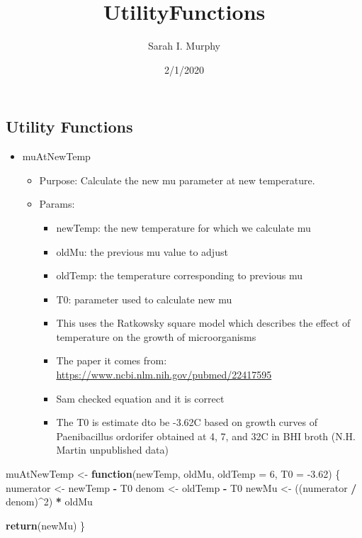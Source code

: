 \documentclass[]{article}
\title{UtilityFunctions}
\author{Sarah I. Murphy}
\date{2/1/2020}
\newenvironment{Shaded}{\begin{snugshade}}{\end{snugshade}}
\newcommand{\ControlFlowTok}[1]{\textcolor[rgb]{0.13,0.29,0.53}{\textbf{#1}}}
\newcommand{\DataTypeTok}[1]{\textcolor[rgb]{0.13,0.29,0.53}{#1}}
\newcommand{\DecValTok}[1]{\textcolor[rgb]{0.00,0.00,0.81}{#1}}
\newcommand{\FloatTok}[1]{\textcolor[rgb]{0.00,0.00,0.81}{#1}}
\newcommand{\KeywordTok}[1]{\textcolor[rgb]{0.13,0.29,0.53}{\textbf{#1}}}
\newcommand{\NormalTok}[1]{#1}
\newcommand{\OperatorTok}[1]{\textcolor[rgb]{0.81,0.36,0.00}{\textbf{#1}}}
\newcommand{\StringTok}[1]{\textcolor[rgb]{0.31,0.60,0.02}{#1}}
\providecommand{\tightlist}{%
  \setlength{\itemsep}{0pt}\setlength{\parskip}{0pt}}
\begin{document}
\maketitle

\hypertarget{utility-functions}{%
\subsection{Utility Functions}\label{utility-functions}}

\begin{itemize}
\tightlist
\item
  muAtNewTemp

  \begin{itemize}
  \tightlist
  \item
    Purpose: Calculate the new mu parameter at new temperature.
  \item
    Params:

    \begin{itemize}
    \tightlist
    \item
      newTemp: the new temperature for which we calculate mu
    \item
      oldMu: the previous mu value to adjust
    \item
      oldTemp: the temperature corresponding to previous mu
    \item
      T0: parameter used to calculate new mu
    \item
      This uses the Ratkowsky square model which describes the effect of
      temperature on the growth of microorganisms
    \item
      The paper it comes from:
      \url{https://www.ncbi.nlm.nih.gov/pubmed/22417595}
    \item
      Sam checked equation and it is correct
    \item
      The T0 is estimate dto be -3.62C based on growth curves of
      Paenibacillus ordorifer obtained at 4, 7, and 32C in BHI broth
      (N.H. Martin unpublished data)
    \end{itemize}
  \end{itemize}
\end{itemize}

\begin{Shaded}
\begin{Highlighting}[]
\NormalTok{muAtNewTemp <-}\StringTok{ }\ControlFlowTok{function}\NormalTok{(newTemp, oldMu, }\DataTypeTok{oldTemp =} \DecValTok{6}\NormalTok{, }\DataTypeTok{T0 =} \FloatTok{-3.62}\NormalTok{) \{}
\NormalTok{  numerator <-}\StringTok{ }\NormalTok{newTemp }\OperatorTok{-}\StringTok{ }\NormalTok{T0}
\NormalTok{  denom <-}\StringTok{ }\NormalTok{oldTemp }\OperatorTok{-}\StringTok{ }\NormalTok{T0}
\NormalTok{  newMu <-}\StringTok{ }\NormalTok{((numerator }\OperatorTok{/}\StringTok{ }\NormalTok{denom)}\OperatorTok{^}\DecValTok{2}\NormalTok{) }\OperatorTok{*}\StringTok{ }\NormalTok{oldMu}
  
  \KeywordTok{return}\NormalTok{(newMu)}
\NormalTok{\}}
\end{Highlighting}
\end{Shaded}
\end{document}
